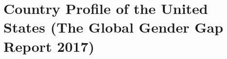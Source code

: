 \chapter{Country Profile of the United States (The Global Gender Gap Report 2017)}
\label{appendixA}
\thispagestyle{empty}


